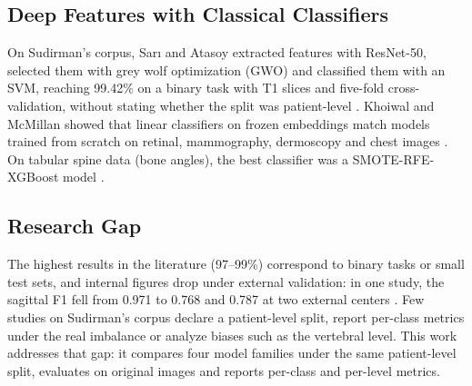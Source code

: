 \subsection{Deep Features with Classical Classifiers}
On Sudirman's corpus, Sar{\i} and Atasoy extracted features with ResNet-50, selected them with grey wolf optimization (GWO) and classified them with an SVM, reaching 99.42\% on a binary task with T1 slices and five-fold cross-validation, without stating whether the split was patient-level \cite{sari2025}. Khoiwal and McMillan showed that linear classifiers on frozen embeddings match models trained from scratch on retinal, mammography, dermoscopy and chest images \cite{khoiwal2024}. On tabular spine data (bone angles), the best classifier was a SMOTE-RFE-XGBoost model \cite{zhang2023}.

\subsection{Research Gap}
The highest results in the literature (97--99\%) correspond to binary tasks or small test sets, and internal figures drop under external validation: in one study, the sagittal F1 fell from 0.971 to 0.768 and 0.787 at two external centers \cite{yi2023}. Few studies on Sudirman's corpus declare a patient-level split, report per-class metrics under the real imbalance or analyze biases such as the vertebral level. This work addresses that gap: it compares four model families under the same patient-level split, evaluates on original images and reports per-class and per-level metrics.
